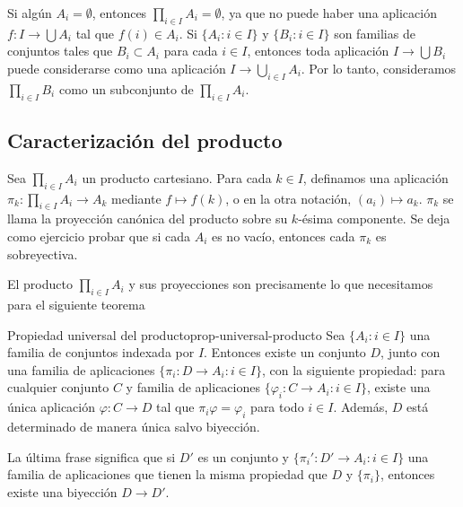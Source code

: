 Si algún $A_i = \emptyset$, entonces $\prod_{i \in I} A_i = \emptyset$, ya que no puede haber una aplicación $f: I \to \bigcup A_i$ tal que $f(i) \in A_i$. Si $\{A_i : i \in I\}$ y $\{B_i : i \in I\}$ son familias de conjuntos tales que $B_i \subset A_i$ para cada $i \in I$, entonces toda aplicación $I \to \bigcup B_i$ puede considerarse como una aplicación $I \to \bigcup_{i \in I} A_i$. Por lo tanto, consideramos $\prod_{i \in I} B_i$ como un subconjunto de $\prod_{i \in I} A_i$.

\subsection{Caracterización del producto}

Sea $\prod_{i \in I} A_i$ un producto cartesiano. Para cada $k \in I$, definamos una aplicación $\pi_k: \prod_{i \in I} A_i \to A_k$ mediante $f \mapsto f(k)$, o en la otra notación, $(a_i) \mapsto a_k$. $\pi_k$ se llama la {proyección canónica} del producto sobre su $k$-ésima componente. Se deja como ejercicio probar que si cada $A_i$ es no vacío, entonces cada $\pi_k$ es sobreyectiva.

El producto $\prod_{i \in I} A_i$ y sus proyecciones son precisamente lo que necesitamos para el siguiente teorema

\begin{theorem}{Propiedad universal del producto}{prop-universal-producto}
    Sea $\{A_i : i \in I\}$ una familia de conjuntos indexada por $I$. Entonces existe un conjunto $D$, junto con una familia de aplicaciones $\{\pi_i: D \to A_i : i \in I\}$, con la siguiente propiedad: para cualquier conjunto $C$ y familia de aplicaciones $\{\varphi_i: C \to A_i : i \in I\}$, existe una única aplicación $\varphi: C \to D$ tal que $\pi_i \varphi = \varphi_i$ para todo $i \in I$. Además, $D$ está determinado de manera única salvo biyección.
\end{theorem}

La última frase significa que si $D'$ es un conjunto y $\{\pi_i': D' \to A_i : i \in I\}$ una familia de aplicaciones que tienen la misma propiedad que $D$ y $\{\pi_i\}$, entonces existe una biyección $D \to D'$.

